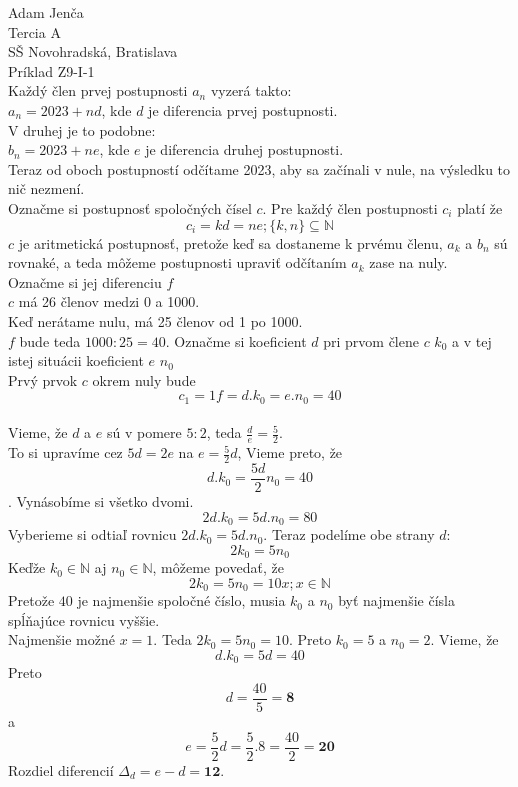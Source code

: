 \documentclass{article}
\newcommand \nat{%
	\mathbb{N}
	}
\newcommand \innat{%
	\in\nat
	}
\begin{document}
\noindent
\large
Adam Jenča\\
Tercia A\\
SŠ Novohradská, Bratislava\\
Príklad Z9-I-1\\
\vskip 10mm \noindent
Každý člen prvej postupnosti $a_n$ vyzerá takto:\\

{ $a_n = 2023 + nd$, kde $d$ je diferencia prvej postupnosti.}\\
\noindent
V druhej je to podobne:\\

{$b_n = 2023 + ne$, kde $e$ je diferencia druhej postupnosti.}\\\noindent
Teraz od oboch postupností odčítame 2023, aby sa začínali v nule, na výsledku to nič nezmení.\\


\noindent
Označme si postupnosť spoločných čísel $c$.
Pre každý člen postupnosti $c_i$ platí že 
$$
c_i = kd = ne ; \{k,n\}\subseteq \nat
$$
$c$ je aritmetická postupnosť, pretože keď sa dostaneme k prvému členu, $a_k$ a $b_n$  sú rovnaké, a teda môžeme postupnosti upraviť odčítaním $a_k$ zase na nuly.\\
Označme si jej diferenciu $f$\\
$c$ má 26 členov medzi 0 a 1000.\\
Keď nerátame nulu, má 25 členov od 1 po 1000.\\
$f$ bude teda $1000:25=40$.
Označme si koeficient $d$ pri prvom člene $c$ $k_0$ a v tej istej situácii koeficient $e$ $n_0$\\
Prvý prvok $c$ okrem nuly bude $$c_1=1f=d. k_0=e. n_0=40$$\\
Vieme, že $d$ a $e$ sú v pomere $5:2$, teda $\frac{d}{e} = \frac{5}{2}$.\\
To si upravíme cez $5d = 2e$ na $e=\frac{5}{2}d$,
Vieme preto, že $$d. k_0 = \frac{5d}{2}n_0 = 40$$.
Vynásobíme si všetko dvomi.
$$2d. k_0 = 5d. n_0 = 80$$
Vyberieme si odtiaľ rovnicu $2d. k_0 = 5d. n_0$.
Teraz podelíme obe strany $d$:
$$2k_0 = 5n_0$$
Keďže $k_0 \innat$ aj $n_0\innat$, môžeme povedať, že $$2k_0 = 5n_0 = 10x; x\innat$$
Pretože $40$ je najmenšie spoločné číslo, musia $k_0$ a $n_0$ byť najmenšie čísla spĺňajúce rovnicu vyššie.\\
Najmenšie možné $x = 1$. Teda $2k_0 = 5n_0 = 10$.
Preto $k_0 = 5$ a $n_0 = 2$.
Vieme, že 
$$d. k_0 = 5d = 40$$
\noindent Preto
$$d = \frac{40}{5} =\mathbf{8}$$
\noindent
a $$e = \frac{5}{2}d=\frac{5}{2}. 8 = \frac{40}{2}=\mathbf{20}$$
\noindent
Rozdiel diferencií $\Delta_d=e-d=\mathbf{12}$.
\end{document}
